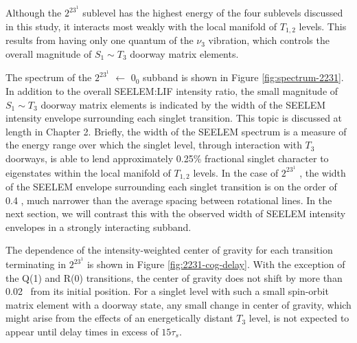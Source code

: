 Although the $2^23^1$  sublevel has the highest energy of the
four sublevels discussed in this study, it interacts most weakly with
the local manifold of $T_{1,2}$ levels.  This results from having only
one quantum of the $\nu_3$ vibration, which controls the overall
magnitude of $S_1 \sim T_3$ doorway matrix elements.

The spectrum of the $2^23^1$  $\leftarrow$ $0_0$ subband is
shown in Figure \ref{fig:spectrum-2231}.  In addition to the overall
SEELEM:LIF intensity ratio, the small magnitude of $S_1 \sim T_3$
doorway matrix elements is indicated by the width of the SEELEM
intensity envelope surrounding each singlet transition.  This topic is
discussed at length in Chapter 2.  Briefly, the width of the SEELEM
spectrum is a measure of the energy range over which the singlet
level, through interaction with $T_3$ doorways, is able to lend
approximately 0.25\% fractional singlet character to eigenstates
within the local manifold of $T_{1,2}$ levels.  In the case of
$2^23^1$ , the width of the SEELEM envelope surrounding each
singlet transition is on the order of 0.4 \rcm, much narrower than the
average spacing between rotational lines.  In the next section, we
will contrast this with the observed width of SEELEM intensity
envelopes in a strongly interacting subband.


The dependence of the intensity-weighted center of gravity for each
transition terminating in $2^23^1$  is shown in Figure
\ref{fig:2231-cog-delay}.  With the exception of the Q(1) and R(0)
transitions, the center of gravity does not shift by more than 0.02
\rcm\ from its initial position.  For a singlet level with such a
small spin-orbit matrix element with a doorway state, any small change
in center of gravity, which might arise from the effects of an
energetically distant $T_3$ level, is not expected to appear until
delay times in excess of $15\tau_s$.


